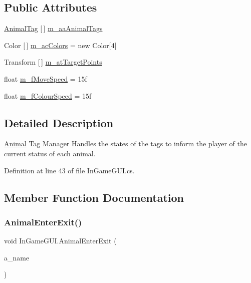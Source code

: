 \subsection*{Public Attributes}
\begin{DoxyCompactItemize}
\item 
\mbox{\hyperlink{class_animal_tag}{Animal\+Tag}} \mbox{[}$\,$\mbox{]} \mbox{\hyperlink{class_in_game_g_u_i_a5f9cd0a6ae4a2ebb4292caa321154d41}{m\+\_\+aa\+Animal\+Tags}}
\item 
Color \mbox{[}$\,$\mbox{]} \mbox{\hyperlink{class_in_game_g_u_i_a695f7ff46144651fde8d49c8803322bc}{m\+\_\+ac\+Colors}} = new Color\mbox{[}4\mbox{]}
\item 
Transform \mbox{[}$\,$\mbox{]} \mbox{\hyperlink{class_in_game_g_u_i_a9b89ef2eec28616bb5c77d8ad9006cb0}{m\+\_\+at\+Target\+Points}}
\item 
float \mbox{\hyperlink{class_in_game_g_u_i_a713c3c56cb7dc6c2063d9fa1c50f582f}{m\+\_\+f\+Move\+Speed}} = 15f
\item 
float \mbox{\hyperlink{class_in_game_g_u_i_a2324993de9dd4fa25a4ae3d2f86b8a86}{m\+\_\+f\+Colour\+Speed}} = 15f
\end{DoxyCompactItemize}


\subsection{Detailed Description}
\mbox{\hyperlink{class_animal}{Animal}} Tag Manager Handles the states of the tags to inform the player of the current status of each animal. 



Definition at line 43 of file In\+Game\+G\+U\+I.\+cs.



\subsection{Member Function Documentation}
\mbox{\label{class_in_game_g_u_i_a4fe29a0f09284e08e713e823b9f5b73f}} 
\subsubsection{\texorpdfstring{Animal\+Enter\+Exit()}{AnimalEnterExit()}}
{\footnotesize\ttfamily void In\+Game\+G\+U\+I.\+Animal\+Enter\+Exit (\begin{DoxyParamCaption}\item[{\mbox{\hyperlink{_animal_8cs_a2fa5713399b84d1b88dae9196837af50}{A\+N\+I\+M\+A\+L\+\_\+\+N\+A\+ME}}}]{a\+\_\+name }\end{DoxyParamCaption})}



